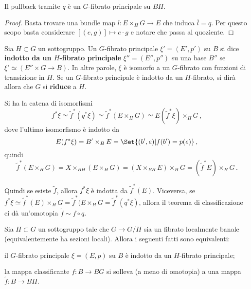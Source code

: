 \begin{lemma}
	Il pullback tramite $q$ è un $G$-fibrato principale su $BH$.
	\begin{proof}
		Basta trovare una bundle map $l:E \times_{H} G \to E$
		che induca $\overline{l} =q$. Per questo scopo basta considerare
		$[(e,g)] \mapsto e \cdot g$ e notare che passa al quoziente.
	\end{proof}
\end{lemma}

\begin{df}
	Sia $H \subset G$ un sottogruppo.
	Un $G$-fibrato principale $\xi'= (E',p')$ su $B$ si dice
	\textbf{indotto da un $H$-fibrato principale} $\xi''=(E'',p'')$
	su una base $B''$ se $\xi' \simeq \left( E'' \times G \to B \right)$.
	In altre parole, $\xi$ è isomorfo a un $G$-fibrato con funzioni di transizione in $H$.
	Se un $G$-fibrato principale è indotto da un $H$-fibrato,
	si dirà allora che $G$ si \textbf{riduce} a $H$.
\end{df}

\begin{oss}
	Si ha la catena di isomorfismi
	\begin{equation*}
		f^{*}\xi \simeq \widetilde{f}^{*} (q^{*}\xi) 
		\simeq \widetilde{f}^{*}\left(E \times_{H} G \right)
		\simeq E(\widetilde{f}^{*}\xi) \times_{H} G\,,  
	\end{equation*}
	dove l'ultimo isomorfismo è indotto da
	\begin{equation*}
		E(f^{*}\xi) = B' \times_{B} E = \Set{(b',e) | f(b') = p(e)}\,,
	\end{equation*}
	quindi
	\begin{equation*}
		\widetilde{f}^{*}(E \times_{H} G)
		= X \times_{BH} (E \times_{H} G)
		= (X \times_{BH} E) \times_{H} G
		= (\widetilde{f}^{*}E) \times_{H} G\,.
	\end{equation*}
\end{oss}

Quindi se esiste $\widetilde{f}$, allora $f^{*}\xi$ è indotta da $\widetilde{f}^{*}(E)$.
Viceversa, se $f^{*}\xi \simeq \widetilde{f}^{*}(E) \times_{H} G = \widetilde{f}^{*}(E \times_{H} G = \widetilde{f}^{*}(q^{*}\xi)$, allora il teorema di classificazione ci dà un'omotopia
$\widetilde{f} \sim f \circ q$.

\begin{thm}
	Sia $H \subset G$ un sottogruppo tale che $G \to G/H$ sia un fibrato localmente banale
	(equivalentemente ha sezioni locali). Allora i seguenti fatti sono equivalenti:
	\begin{rmnumerate}
		\item il $G$-fibrato principale $\xi = (E,p)$ su $B$ è indotto da un $H$-fibrato principale;
		\item la mappa classificante $f:B \to BG$ si solleva (a meno di omotopia)
		a una mappa $\widetilde{f}:B \to BH$.
	\end{rmnumerate}
\end{thm}

